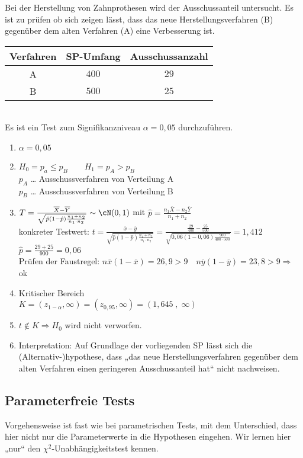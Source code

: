 \documentclass{scrreprt}
\begin{document}
 Bei der Herstellung von Zahnprothesen wird der Ausschussanteil untersucht. Es ist zu prüfen ob sich zeigen lässt, dass das neue Herstellungsverfahren (B) gegenüber dem alten Verfahren (A) eine Verbesserung ist.\\
\begin{tabular}{c | c | c}
Verfahren & SP-Umfang & Ausschussanzahl\\\hline
A & $400$ & $29$\\
B & $500$ & $25$
\end{tabular}\\
Es ist ein Test zum Signifikanzniveau $\alpha=0,05$ durchzuführen.
\begin{enumerate}
\item $\alpha = 0,05$
\item $H_0=p_a \leq p_B \qquad H_1= p_A > p_B$\\
$p_A$ … Ausschussverfahren von Verteilung A\\
$p_B$ … Ausschussverfahren von Verteilung B
\item $T=\frac{\overline{X}-\overline{Y}}{\sqrt{\hat{p}(1-\hat{p})\frac{n_1+n_2}{n_1\cdot n_2}}} \sim \cN(0,1)$ mit $\hat{p}=\frac{n_1 \overline{X}-n_2 \overline{Y}}{n_1+n_2}$\\
konkreter Testwert: $t=\frac{\overline{x}-\overline{y}}{\sqrt{\hat{p}(1-\hat{p})\frac{n_1+n_2}{n_1\cdot n_2}}}=\frac{\frac{29}{400}-\frac{25}{500}}{\sqrt{0,06(1-0,06)\frac{900}{400\cdot 500}}}=1,412$\\
$\hat{p}=\frac{29+25}{900}=0,06$\\
Prüfen der Faustregel: $n\overline{x}(1-\overline{x})=26,9 > 9 \quad n\overline{y}(1-\overline{y})=23,8>9 \Rightarrow$ ok
\item Kritischer Bereich\\
$K=(z_{1-\alpha}, \infty) = (z_{0,95}, \infty) = (1,645\;,\;\infty)$
\item $t\not \in K \Rightarrow H_0$ wird nicht verworfen.
\item Interpretation: Auf Grundlage der vorliegenden SP lässt sich die (Alternativ-)hypothese, dass „das neue Herstellungsverfahren gegenüber dem alten Verfahren einen geringeren Ausschussanteil hat“ nicht nachweisen.
\end{enumerate}

\subsection{Parameterfreie Tests}
Vorgehensweise ist fast wie bei parametrischen Tests, mit dem Unterschied, dass hier nicht nur die Parameterwerte in die Hypothesen eingehen. Wir lernen hier „nur“ den $\chi^2$-Un\-ab\-häng\-ig\-keits\-test kennen.
\end{document}
